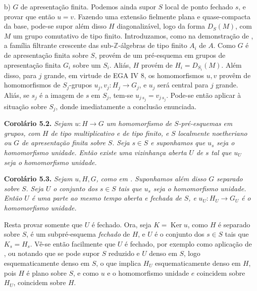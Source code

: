 b) \(G\) de
apresentação finita. Podemos ainda supor \(S\) local de ponto
fechado \(s\), e provar que então \(u=v\). Fazendo uma extensão
fielmente plana e quase-compacta da base, pode-se supor além
disso \(H\) diagonalizável, logo da forma \(D_S(M)\), com
\(M\) um grupo comutativo de tipo finito. Introduzamos, como na
demonstração de , a
família filtrante crescente das sub-\(\mathbb Z\)-álgebras de
tipo finito \(A_i\) de \(A\). Como \(G\) é de apresentação
finita sobre \(S\), provém de um pré-esquema em grupos de
apresentação finita \(G_i\) sobre um \(S_i\). Aliás, \(H\)
provém de \(H_i=D_{S_i}(M)\). Além disso, para \(j\) grande,
em virtude de EGA IV 8, os homomorfismos \(u,v\) provêm de
homomorfismos de \(S_j\)-grupos \(u_j,v_j:H_j\to G_j\), e
\(u_j\) será central para \(j\) grande. Aliás, se \(s_j\) é
a imagem de \(s\) em \(S_j\), tem-se
\(u_{j\,s_j}=v_{j\,s_j}\). Pode-se então aplicar
 à situação
sobre \(S_j\), donde imediatamente a conclusão enunciada.

\medskip
\noindent{}\textbf{Corolário 5.2.}
\textit{Sejam \(u:H\to G\) um homomorfismo de \(S\)-pré-esquemas
em grupos, com \(H\) de tipo multiplicativo e de tipo finito,
e \(S\) localmente noetheriano ou \(G\) de apresentação finita
sobre \(S\). Seja \(s\in S\) e suponhamos que \(u_s\) seja o
homomorfismo unidade. Então existe uma vizinhança aberta \(U\)
de \(s\) tal que \(u_U\) seja o homomorfismo unidade.}

\medskip
\noindent{}\textbf{Corolário 5.3.}
\textit{Sejam \(u,H,G\), como em
. Suponhamos além disso
\(G\) separado sobre \(S\). Seja \(U\) o conjunto dos
\(s\in S\) tais que \(u_s\) seja o homomorfismo unidade. Então
\(U\) é uma parte ao mesmo tempo aberta e fechada de \(S\),
e \(u_U:H_U\to G_U\) é o homomorfismo unidade.}

Resta provar somente que \(U\) é fechado. Ora, seja
\(K=\operatorname{Ker}u\), como \(H\) é separado sobre \(S\),
é um subpré-esquema \emph{fechado} de \(H\), e \(U\) é o
conjunto dos \(s\in S\) tais que \(K_s=H_s\). Vê-se então
facilmente que \(U\) é fechado, por exemplo como aplicação de
, ou notando que
se pode supor \(S\) reduzido e \(U\) denso em \(S\), logo
esquematicamente denso em \(S\), o que implica \(H_U\)
esquematicamente denso em \(H\), pois \(H\) é plano sobre
\(S\), e como \(u\) e o homomorfismo unidade \(e\) coincidem
sobre \(H_U\), coincidem sobre \(H\).


